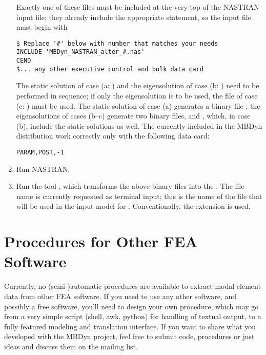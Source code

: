 \begin{enumerate}
\begin{enumerate}
\end{enumerate}
Exactly one of these files must be included at the very top 
of the NASTRAN input file;
they already include the appropriate  statement, so the
input file must begin with
\begin{verbatim}
$ Replace '#' below with number that matches your needs
INCLUDE 'MBDyn_NASTRAN_alter_#.nas'
CEND
$... any other executive control and bulk data card
\end{verbatim}
The static solution of case (a: ) and the eigensolution
of case (b: ) need to be performed in sequence; 
if only the eigensolution is to be used, the  file 
of case (c: ) must be used.
The static solution of case (a) generates a binary file ;
the eigensolutions of cases (b--c) generate two binary files, 
 and , which, in case (b), include
the static solutions as well.
The  currently included in the MBDyn distribution work 
correctly only with the following  data card:
\begin{verbatim}
PARAM,POST,-1 
\end{verbatim}


\item Run NASTRAN.


\item Run the tool , which transforms the above binary files
into the .
The file name is currently requested as terminal input; this is the name 
of the file that will be used in the input model for .
Conventionally, the  extension is used.

\end{enumerate} %



\section{Procedures for Other FEA Software}
Currently, no (semi-)automatic procedures are available to extract modal
element data from other FEA software.
If you need to use any other software, and possibly a free software,
you'll need to design your own procedure, which may go from a very simple
script (shell, awk, python) for handling of textual output, to a fully
featured modeling and translation interface.
If you want to share what you developed with the MBDyn project, feel free
to submit code, procedures or just ideas and discuss them on the
mailing list.

